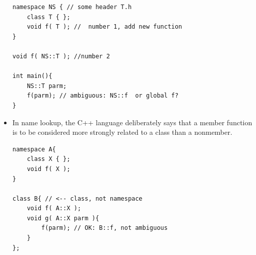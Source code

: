 \documentclass[a4paper,11pt,twoside]{book}
\begin{document}
\begin{itemize}
\begin{lstlisting}[numbers=none]
namespace NS { // some header T.h
	class T { };
	void f( T ); //  number 1, add new function
}

void f( NS::T ); //number 2
	
int main(){
	NS::T parm;
	f(parm); // ambiguous: NS::f  or global f?
}
\end{lstlisting}
	
	
	\item In name lookup, the C++ language deliberately says that a member function is to be considered more strongly related to a class than a nonmember.
\begin{lstlisting}[numbers=none]
namespace A{
	class X { };
	void f( X );
}
	
class B{ // <-- class, not namespace
	void f( A::X );
	void g( A::X parm ){
		f(parm); // OK: B::f, not ambiguous
	}
};
\end{lstlisting}
	
																						  
																																												   
 
																																																	  
								
			
			
								   
 
 
		   
				
 
																															 
 
								
				 
			 
			 
 

													 
					
												   
				
\end{itemize}
\end{document}
